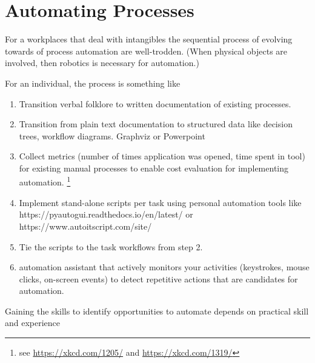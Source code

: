\section{Automating Processes}


For a workplaces that deal with intangibles the sequential process of evolving towards of process automation are well-trodden.  (When physical objects are involved, then robotics is necessary for automation.)



For an individual, the process is something like
\begin{enumerate}
    \item Transition verbal folklore to written documentation of existing processes.
    \item Transition from plain text documentation to structured data like decision trees, workflow diagrams. Graphviz or Powerpoint
    \item Collect metrics (number of times application was opened, time spent in tool) for existing manual processes to enable cost evaluation for implementing automation. \footnote{see \href{https://xkcd.com/1205/}{https://xkcd.com/1205/} and \href{https://xkcd.com/1319/}{https://xkcd.com/1319/}}
    \item Implement stand-alone scripts per task using personal automation tools like https://pyautogui.readthedocs.io/en/latest/ or https://www.autoitscript.com/site/
    \item Tie the scripts to the task workflows from step 2.
    \item automation assistant that actively monitors your activities (keystrokes, mouse clicks, on-screen events) to detect repetitive actions that are candidates for automation.
\end{enumerate}

Gaining the skills to identify opportunities to automate depends on practical skill and experience


